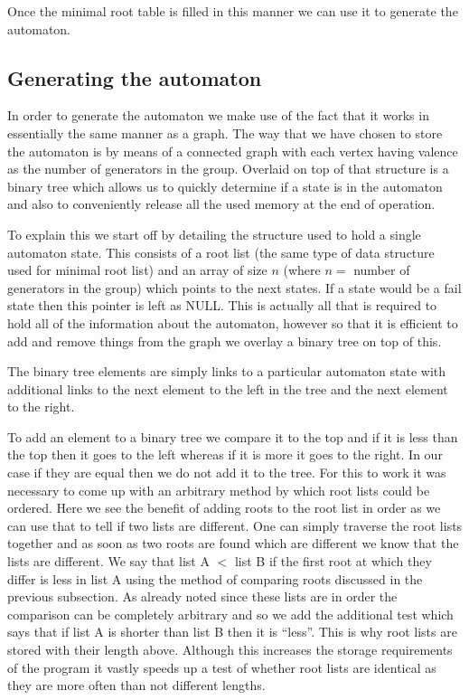 \documentclass[a4paper,12pt]{article}
\begin{document}
Once the minimal root table is filled in this manner we can use it to generate the automaton.

\subsection{Generating the automaton}
In order to generate the automaton we make use of the fact that it works in essentially the same manner as a graph. The way that we have chosen to store the automaton is by means of a connected graph with each vertex having valence as the number of generators in the group. Overlaid on top of that structure is a binary tree which allows us to quickly determine if a state is in the automaton and also to conveniently release all the used memory at the end of operation.

To explain this we start off by detailing the structure used to hold a single automaton state. This consists of a root list (the same type of data structure used for minimal root list) and an array of size $n$ (where $n= $ number of generators in the group) which points to the next states. If a state would be a fail state then this pointer is left as NULL. This is actually all that is required to hold all of the information about the automaton, however so that it is efficient to add and remove things from the graph we overlay a binary tree on top of this.

The binary tree elements are simply links to a particular automaton state with additional links to the next element to the left in the tree and the next element to the right. 

To add an element to a binary tree we compare it to the top and if it is less than the top then it goes to the left whereas if it is more it goes to the right. In our case if they are equal then we do not add it to the tree. For this to work it was necessary to come up with an arbitrary method by which root lists could be ordered. Here we see the benefit of adding roots to the root list in order as we can use that to tell if two lists are different. One can simply traverse the root lists together and as soon as two roots are found which are different we know that the lists are different. We say that list A $<$ list B if the first root at which they differ is less in list A using the method of comparing roots discussed in the previous subsection. As already noted since these lists are in order the comparison can be completely arbitrary and so we add the additional test which says that if list A is shorter than list B then it is ``less''. This is why root lists are stored with their length above. Although this increases the storage requirements of the program it vastly speeds up a test of whether root lists are identical as they are more often than not different lengths.
\end{document}
